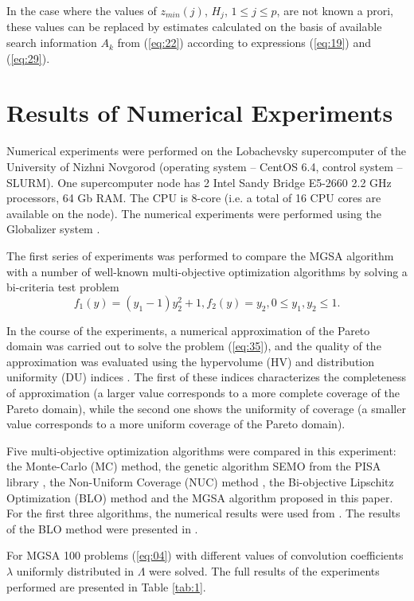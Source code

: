 \documentclass[runningheads]{llncs}
\begin{document}
In the case where the values of $z_{min} (j)$, $H_j$, $1 \leq j \leq p$, are not known a prori, these values can be replaced by estimates calculated on the basis of available search information $A_k$ from (\ref{eq:22}) according to expressions (\ref{eq:19}) and (\ref{eq:29}).


\section{Results of Numerical Experiments} \label{sec:05}

Numerical experiments were performed on the Lobachevsky supercomputer of the University of Nizhni Novgorod (operating system -- CentOS 6.4, control system -- SLURM). One supercomputer node has 2 Intel Sandy Bridge E5-2660 2.2 GHz processors, 64 Gb RAM. The CPU is 8-core (i.e. a total of 16 CPU cores are available on the node). The numerical experiments were performed using the Globalizer system \cite{c38}.

      The first series of experiments was performed to compare the MGSA algorithm with a number of well-known multi-objective optimization algorithms by solving a bi-criteria test problem \cite{c40}
\begin{equation}
\label{eq:35}
f_1 (y)=(y_1-1) y_2^2+1,f_2 (y)=y_2, 0 \leq y_1, y_2 \leq 1.
\end{equation}

In the course of the experiments, a numerical approximation of the Pareto domain was carried out to solve the problem (\ref{eq:35}), and the quality of the approximation was evaluated using the hypervolume (HV) and distribution uniformity (DU) indices \cite{c37,c40}. The first of these indices characterizes the completeness of approximation (a larger value corresponds to a more complete coverage of the Pareto domain), while the second one shows the uniformity of coverage (a smaller value corresponds to a more uniform coverage of the Pareto domain).

Five multi-objective optimization algorithms were compared in this experiment: the Monte-Carlo (MC) method, the genetic algorithm SEMO from the PISA library \cite{c42}, the Non-Uniform Coverage (NUC) method \cite{c40}, the Bi-objective Lipschitz Optimization (BLO) method \cite{c39} and the MGSA algorithm proposed in this paper. For the first three algorithms, the numerical results were used from \cite{c41}. The results of the BLO method were presented in \cite{c39}.

For MGSA 100 problems (\ref{eq:04}) with different values of convolution coefficients $\lambda$ uniformly distributed in $\Lambda$ were solved. The full results of the experiments performed are presented in Table \ref{tab:1}.
\end{document}
